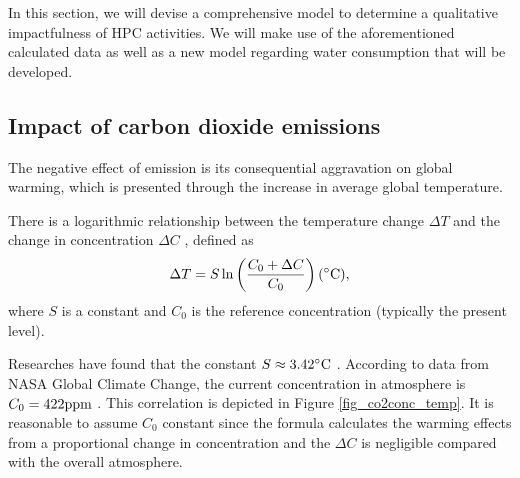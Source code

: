 \documentclass[12pt]{article}
\begin{document}
In this section, we will devise a comprehensive model to determine a qualitative impactfulness of HPC activities. We will make use of the aforementioned calculated data as well as a new model regarding water consumption that will be developed.

\subsection{Impact of carbon dioxide emissions}

The negative effect of  emission is its consequential aggravation on global warming, which is presented through the increase in average global temperature.

There is a logarithmic relationship between the temperature change $\Delta T$ and the change in  concentration $\Delta C$ \citep{co2emission_log}, defined as
\begin{equation}
	\Delta T = S \ln \left(\frac{C_0 + \Delta C}{C_0}\right) \rm (^\circ C),
\end{equation}
where $S$ is a constant and $C_0$ is the reference concentration (typically the present level).

Researches have found that the constant $S \approx 3.42 \rm ^\circ C$ \citep{co2conc_warming_relationship}. According to data from NASA Global Climate Change, the current  concentration in atmosphere is $C_0 = 422 \rm ppm$ \citep{co2conc}. This correlation is depicted in Figure \ref{fig_co2conc_temp}. It is reasonable to assume $C_0$ constant since the formula calculates the warming effects from a proportional change in concentration and the $\Delta C$ is negligible compared with the overall atmosphere.
\end{document}
